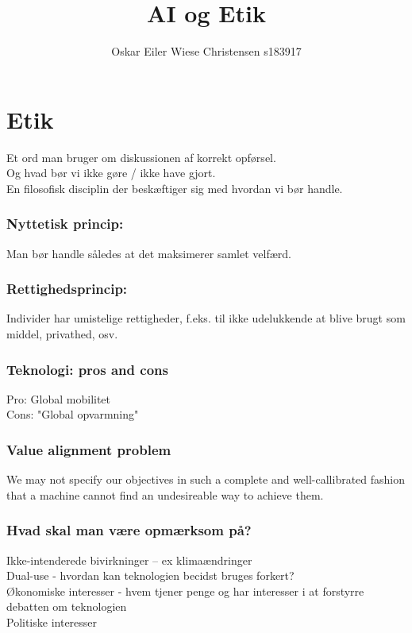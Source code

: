 \documentclass[11pt, fleqn]{article}
\title{AI og Etik}
\author{Oskar Eiler Wiese Christensen s183917}
\date{}
\begin{document}
	
	\maketitle
	
	\section*{Etik}
	Et ord man bruger om diskussionen af korrekt opførsel. \\ Og hvad bør vi ikke gøre / ikke have gjort. \\ En filosofisk disciplin der beskæftiger sig med hvordan vi bør handle. \\ 
	
	\subsubsection*{Nyttetisk princip:}
	\vspace*{-0.2cm}
	Man bør handle således at det maksimerer samlet velfærd.
	
	\subsubsection*{Rettighedsprincip:}
	\vspace*{-0.2cm}
	Individer har umistelige rettigheder, f.eks. til ikke udelukkende at blive brugt som middel, privathed, osv.

	\subsubsection*{Teknologi: pros and cons}
	\vspace*{-0.2cm}
	Pro: Global mobilitet \\ Cons: "Global opvarmning"
	
	\subsubsection*{Value alignment problem}
	\vspace*{-0.2cm}
	We may not specify our objectives in such a complete and well-callibrated fashion that a machine cannot find an undesireable way to achieve them.
	
	\subsubsection*{Hvad skal man være opmærksom på?}
	\vspace*{-0.2cm}
	Ikke-intenderede bivirkninger -- ex klimaændringer \\
	Dual-use - hvordan kan teknologien becidst bruges forkert? \\ 
	Økonomiske interesser - hvem tjener penge og har interesser i at forstyrre debatten om teknologien \\ 
	Politiske interesser
	
\end{document}
